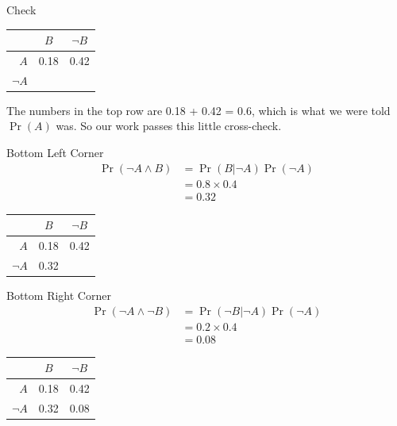 \documentclass[
  ignorenonframetext,
]{beamer}
\renewcommand{\,}{\text{, }}
\begin{document}
\begin{frame}{Check}
\protect\hypertarget{check}{}
\begin{longtable}[]{@{}rcc@{}}
\toprule
& \(B\) & \(\neg B\) \\
\midrule
\endhead
\(A\) & 0.18 & 0.42 \\
\(\neg A\) & & \\
\bottomrule
\end{longtable}

The numbers in the top row are 0.18 + 0.42 = 0.6, which is what we were
told \(\Pr(A)\) was. So our work passes this little cross-check.
\end{frame}

\begin{frame}{Bottom Left Corner}
\protect\hypertarget{bottom-left-corner}{}
\begin{align*}
\Pr(\neg A \wedge B) &= \Pr( B | \neg A) \Pr(\neg A) \\
 &= 0.8 \times 0.4 \\
 &= 0.32
\end{align*}

\pause

\begin{longtable}[]{@{}rcc@{}}
\toprule
& \(B\) & \(\neg B\) \\
\midrule
\endhead
\(A\) & 0.18 & 0.42 \\
\(\neg A\) & 0.32 & \\
\bottomrule
\end{longtable}
\end{frame}

\begin{frame}{Bottom Right Corner}
\protect\hypertarget{bottom-right-corner}{}
\begin{align*}
\Pr(\neg A \wedge \neg B) &= \Pr( \neg B | \neg A) \Pr(\neg A) \\
 &= 0.2 \times 0.4 \\
 &= 0.08
\end{align*}

\pause

\begin{longtable}[]{@{}rcc@{}}
\toprule
& \(B\) & \(\neg B\) \\
\midrule
\endhead
\(A\) & 0.18 & 0.42 \\
\(\neg A\) & 0.32 & 0.08 \\
\bottomrule
\end{longtable}
\end{frame}
\end{document}
